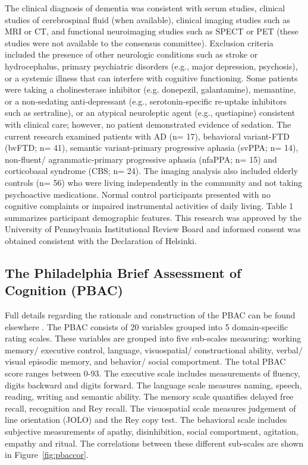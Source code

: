 \documentclass[preprint,authoryear,12pt]{elsarticle}
\begin{document}
The clinical diagnosis of dementia was consistent with serum studies, clinical studies of cerebrospinal fluid (when available), clinical imaging studies such as MRI or CT, and functional neuroimaging studies such as SPECT or PET (these studies were not available to the consensus committee).  Exclusion criteria included the presence of other neurologic conditions such as stroke or hydrocephalus, primary psychiatric disorders (e.g., major depression, psychosis), or a systemic illness that can interfere with cognitive functioning.  Some patients were taking a cholinesterase inhibitor (e.g. donepezil, galantamine), memantine, or a non-sedating anti-depressant (e.g., serotonin-specific re-uptake inhibitors such as sertraline), or an atypical neuroleptic agent (e.g., quetiapine) consistent with clinical care; however, no patient demonstrated evidence of sedation.  The current research examined patients with AD (n= 17), behavioral variant-FTD (bvFTD; n= 41), semantic variant-primary progressive aphasia (svPPA; n= 14), non-fluent/ agrammatic-primary progressive aphasia (nfaPPA; n= 15) and corticobasal syndrome (CBS; n= 24).  The imaging analysis also included elderly controls (n= 56) who were living independently in the community and not taking psychoactive medications.  Normal control participants presented with no cognitive complaints or impaired instrumental activities of daily living.  Table 1 summarizes participant demographic features.  This research was approved by the University of Pennsylvania Institutional Review Board and informed consent was obtained consistent with the Declaration of Helsinki.



\subsection{The Philadelphia Brief Assessment of Cognition (PBAC)} Full details regarding the rationale and construction of the PBAC can be found elsewhere \citet{libon_philadelphia_2011}.  The PBAC consists of 20 variables grouped into 5 domain-specific rating scales.  These variables are grouped into five sub-scales measuring: working memory/ executive control, language, visuospatial/ constructional ability, verbal/ visual episodic memory, and behavior/ social comportment.  The total PBAC score ranges between 0-93. 
The executive scale includes measurements of fluency, digits backward and digits forward.  The language scale measures naming, speech, reading, writing and semantic ability.  The memory scale quantifies delayed free recall, recognition and Rey recall.  The visuospatial scale measures judgement of line orientation (JOLO) and the Rey copy test.  The behavioral scale includes subjective measurements of apathy, disinhibition, social comportment, agitation, empathy and ritual.   The correlations between these different sub-scales are shown in Figure~\ref{fig:pbaccor}.  
\end{document}
